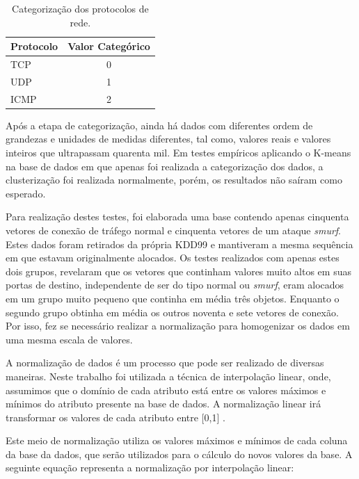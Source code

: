 \begin{table}[h]
\centering
\caption{Categorização dos protocolos de rede.}
\vspace{0.5cm}
\begin{tabular}{|l|c|}
\hline
\textbf{Protocolo} & \textbf{Valor Categórico}\\
\hline
TCP & 0\\
\hline
UDP & 1\\
\hline
ICMP & 2\\
\hline
\end{tabular}
\label{tab4}
\end{table}

\indent Após a etapa de categorização, ainda há dados com diferentes ordem de grandezas e unidades de medidas diferentes, tal como, valores reais e valores inteiros que ultrapassam quarenta mil. Em testes empíricos aplicando o K-means na base de dados em que apenas foi realizada a categorização dos dados, a clusterização foi realizada normalmente, porém, os resultados não saíram como esperado.

\indent Para realização destes testes, foi elaborada uma base contendo apenas cinquenta vetores de conexão de tráfego normal e cinquenta vetores de um ataque \textit{smurf}. Estes dados foram retirados da própria KDD99 e mantiveram a mesma sequência em que estavam originalmente alocados. Os testes realizados com apenas estes dois grupos, revelaram que os vetores que continham valores muito altos em suas portas de destino, independente de ser do tipo normal ou \textit{smurf}, eram alocados em um grupo muito pequeno que continha em média três objetos. Enquanto o segundo grupo obtinha em média os outros noventa e sete vetores de conexão. Por isso, fez se necessário realizar a normalização para homogenizar os dados em uma mesma escala de valores.

\indent A normalização de dados é um processo que pode ser realizado de diversas maneiras. Neste trabalho foi utilizada a técnica de interpolação linear, onde, assumimos que o domínio de cada atributo está entre os valores máximos e mínimos do atributo presente na base de dados. A normalização linear irá transformar os valores de cada atributo entre [0,1] \cite{goldschmidt2005} \cite{Silva2007}.

\indent Este meio de normalização utiliza os valores máximos e mínimos de cada coluna da base da dados, que serão utilizados para o cálculo do novos valores da base. A seguinte equação representa a normalização por interpolação linear:

